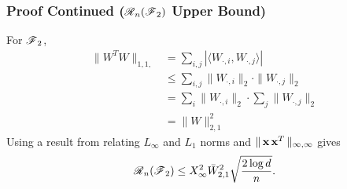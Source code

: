 \begin{frame}
\frametitle{Proof Continued ($\operatorname{\mathscr{R}}_n(\operatorname{\mathscr{F}}_2)$ Upper Bound)}
For $\operatorname{\mathscr{F}}_2$,
\begin{align*}
\|W^TW\|_{1,1,} &= \sum_{i,j} |\langle W_{\cdot,i},   W_{\cdot,j}\rangle| \\
  &\le \sum_{i,j} \|W_{\cdot,i}\|_2 \cdot \|W_{\cdot,j}\|_2 \\
  &= \sum_i \|W_{\cdot,i}\|_2 \cdot \sum_j \|W_{\cdot,j}\|_2 \\
  &= \|W\|_{2,1}^2
\end{align*}
Using a result from \cite{kakade2009complexity} relating $L_\infty$ and $L_1$ norms
and $\|\operatorname{\mathbf{x}}\operatorname{\mathbf{x}}^T\|_{\infty,\infty}$ gives
\[\operatorname{\mathscr{R}}_n(\operatorname{\mathscr{F}}_2) \le X_\infty^2 \bar{W}_{2,1}^2 \sqrt{\frac{2\log d}{n}}.\]
\end{frame}


